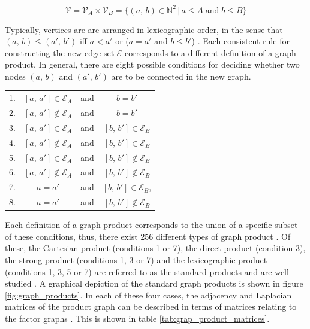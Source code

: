 \begin{equation}
    \mathcal{V} = \mathcal{V}_A \times \mathcal{V}_B = \{(a, \, b) \in \mathbb{N}^2 \, | \, a \leq A \; \text{and} \; b \leq B \}
\end{equation}


Typically, vertices are are arranged in lexicographic order, in the sense that $(a, \, b) \leq (a',\, b')$ iff $a < a'$ or ($a = a'$ and $b \leq b'$) \citep{Harzheim2005}. Each consistent rule for constructing the new edge set $\mathcal{E}$ corresponds to a different definition of a graph product. In general, there are eight possible conditions for deciding whether two nodes $(a, \, b)$ and $(a',\,  b')$ are to be connected in the new graph.



\begin{table}[h]
\def\arraystretch{1.5}
\centering
\begin{tabular}{lclc}
1. & $[a, \, a'] \in \mathcal{E}_A$ & and &  $b = b'$  \\
2. & $[a, \, a'] \notin \mathcal{E}_A$  & and &  $b = b'$  \\
3. & $[a, \, a'] \in \mathcal{E}_A$ & and &  $[b, \, b'] \in \mathcal{E}_B$ \\
4. & $[a, \, a'] \notin \mathcal{E}_A$ & and &  $[b, \, b'] \in \mathcal{E}_B$  \\
5. & $[a, \, a'] \in \mathcal{E}_A$ & and & $[b, \, b'] \notin \mathcal{E}_B$  \\
6. & $[a, \, a'] \notin \mathcal{E}_A$ & and & $[b, \, b'] \notin \mathcal{E}_B$  \\
7. & $a = a'$ & and & $[b, \, b'] \in \mathcal{E}_B$,  \\
8. & $a = a'$ & and &  $[b, \, b'] \notin \mathcal{E}_B$ 
\end{tabular}
\end{table}



Each definition of a graph product corresponds to the union of a specific subset of these conditions, thus, there exist 256 different types of graph product \citep{Barik2015}. Of these, the Cartesian product (conditions 1 or 7), the direct product (condition 3), the strong product (conditions 1, 3 or 7) and the lexicographic product (conditions 1, 3, 5 or 7) are referred to as the standard products and are well-studied \citep{Imrich2000}. A graphical depiction of the standard graph products is shown in figure \ref{fig:graph_products}. In each of these four cases, the adjacency and Laplacian matrices of the product graph can be described in terms of matrices relating to the factor graphs \citep{Fiedler1973, Barik2018}. This is shown in table \ref{tab:grap_product_matrices}. 

